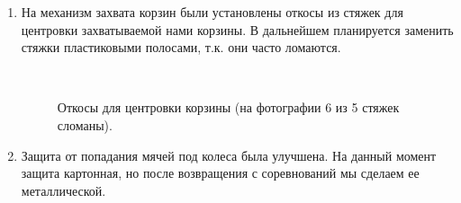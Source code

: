 \begin{enumerate}
	\item На механизм захвата корзин были установлены откосы из стяжек для центровки захватываемой нами корзины. В дальнейшем планируется заменить стяжки  пластиковыми полосами, т.к. они часто ломаются.
	
	\begin{figure}[H]
		\begin{minipage}[h]{0.2\linewidth}
			\center  
		\end{minipage}
		\begin{minipage}[h]{0.6\linewidth}
			\caption{Откосы для центровки корзины (на фотографии 6 из 5 стяжек сломаны).}
		\end{minipage}
	\end{figure}
	
	\item Защита от попадания мячей под колеса была улучшена. На данный момент защита картонная, но после возвращения с соревнований мы сделаем ее металлической.
	

\end{enumerate}
